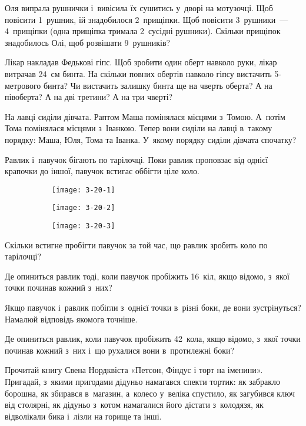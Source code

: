 \problem
Оля випрала рушнички і~вивісила їх сушитись у~дворі на мотузочці.
Щоб повісити 1~рушник, їй знадобилося 2~прищіпки.
Щоб повісити 3~рушники~--- 4~прищіпки (одна прищіпка тримала 2~сусідні рушники).
Скільки прищіпок знадобилось Олі, щоб розвішати 9~рушників?


\problem
Лікар накладав Федькові гіпс.
Щоб зробити один оберт навколо руки, лікар витрачав 24~см бинта.
На скільки повних обертів навколо гіпсу вистачить 5-метрового бинта?
Чи вистачить залишку бинта ще на чверть оберта?
А на півоберта?
А на дві третини?
А на три чверті?


\problem
На лавці сиділи дівчата. Раптом Маша помінялася місцями з~Томою.
А~потім Тома помінялася місцями з~Іванкою.
Тепер вони сиділи на лавці в~такому порядку: Маша, Юля, Тома та Іванка.
У~якому порядку сиділи дівчата спочатку?


\problem
{}
Равлик і~павучок бігають по тарілочці.
Поки равлик проповзає від однієї крапочки до іншої,
павучок встигає оббігти ціле коло.

\begin{figure}[ht]
  \centering
  \begin{subfigure}{0.2\textwidth}
    \texttt{[image: 3-20-1]}
  \end{subfigure}
  \quad
  \begin{subfigure}{0.4\textwidth}
    \texttt{[image: 3-20-2]}
  \end{subfigure}
  \quad
  \begin{subfigure}{0.2\textwidth}
    \texttt{[image: 3-20-3]}
  \end{subfigure}
\end{figure}

Скільки встигне пробігти павучок за той час,
що равлик зробить коло по тарілочці?

Де опиниться равлик тоді, коли павучок пробіжить 16~кіл,
якщо відомо, з~якої точки починав кожний з~них?

Якщо павучок і~равлик побігли з~однієї точки в~різні боки,
де вони зустрінуться?
Намалюй відповідь якомога точніше.

Де опиниться равлик, коли павучок пробіжить 42~кола, якщо відомо,
з~якої точки починав кожний з~них і~що рухалися вони в~протилежні боки?


\problem
Прочитай книгу Свена Нордквіста «Петсон, Фіндус і торт на іменини». Пригадай,
з~якими пригодами дідуньо намагався спекти тортик: як забракло борошна,
як збирався в~магазин, а~колесо у~веліка спустило, як загубився ключ
від столярні, як дідуньо з~котом намагалися його дістати з~колодязя,
як відволікали бика і~лізли на горище та інші.

